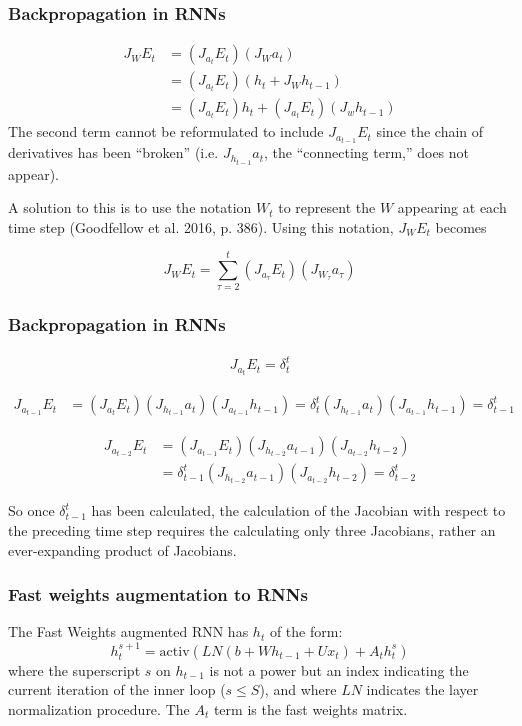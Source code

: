 \documentclass{beamer}
\begin{document}
\begin{frame}
  \frametitle{Backpropagation in RNNs}
  \begin{align*}
  J_{W} E_t & = (J_{a_t} E_t)(J_W a_t) \\
  & = (J_{a_t} E_t)(h_t + J_W h_{t-1}) \\
  & = (J_{a_t} E_t)h_t + (J_{a_t} E_t)(J_w h_{t-1})
\end{align*}
%
  The second term cannot be reformulated to include $J_{a_{t-1}} E_t$ since the chain of derivatives has been ``broken'' (i.e. $J_{h_{t-1}} a_t$, the ``connecting term,'' does not appear).

  \vspace{0.5cm}

  A solution to this is to use the notation $W_t$ to represent the $W$ appearing at each time step (Goodfellow et al. 2016, p. 386). Using this notation, $J_{W} E_t$ becomes

  \begin{equation*}
    J_{W} E_t = \sum_{\tau=2}^{t}  (J_{a_\tau} E_t)(J_{W_\tau} a_\tau)
  \end{equation*}

\end{frame}

\begin{frame}
  \frametitle{Backpropagation in RNNs}
\begin{align*}
  J_{a_t} E_t = \delta_{t}^t
\end{align*}

\begin{align*}
  J_{a_{t-1}} E_t & = (J_{a_t} E_t)(J_{h_{t-1}} a_t)(J_{a_{t-1}} h_{t-1}) = \delta_{t}^t (J_{h_{t-1}} a_{t})(J_{a_{t-1}} h_{t-1})  = \delta_{t-1}^t
\end{align*}

\begin{align*}
  J_{a_{t-2}} E_t & = (J_{a_{t-1}} E_t)(J_{h_{t-2}} a_{t-1})(J_{a_{t-2}} h_{t-2}) \\
  & = \delta_{t-1}^t (J_{h_{t-2}} a_{t-1})(J_{a_{t-2}} h_{t-2}) = \delta_{t-2}^t
\end{align*}

So once $\delta_{t-1}^t$ has been calculated, the calculation of the Jacobian with respect to the preceding time step requires the calculating only three Jacobians, rather an ever-expanding product of Jacobians.

\end{frame}

\begin{frame}
  \frametitle{Fast weights augmentation to RNNs}
  The Fast Weights augmented RNN has $h_t$ of the form:
    \begin{equation*}
      h_t^{s+1} = \mbox{activ}\left(LN(b + Wh_{t-1} + Ux_t) + A_t h_{t}^s\right)
    \end{equation*}
    where the superscript $s$ on $h_{t-1}$ is not a power but an index indicating the current iteration of the inner loop ($s \leq S$), and where $LN$ indicates the layer normalization procedure. The $A_t$ term is the fast weights matrix.
\end{frame}
\end{document}
